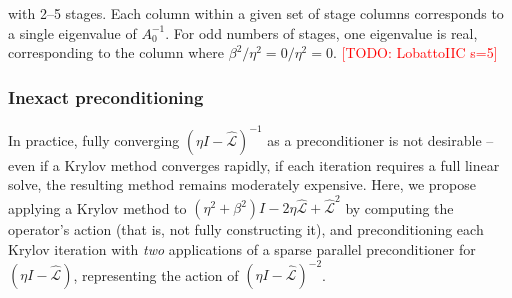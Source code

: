 \documentclass[review]{siamart}
\makeatletter
\newcommand{\todo}[1]{\textcolor{red}{[TODO\@: #1]}}
\makeatother
\begin{document}
{\begin{table}[!ht]
{  with 2--5 stages. Each column within a given set of stage columns corresponds to a
  single eigenvalue of $A_0^{-1}$. For odd numbers of stages, one eigenvalue is real,
  corresponding to the column where $\beta^2/\eta^2 = 0/\eta^2 = 0$.
  \todo{LobattoIIC s=5}}\label{tab:beta}
\end{table}
}

\subsubsection{Inexact preconditioning}

In practice, fully converging $(\eta I - \widehat{\mathcal{L}})^{-1}$ as a preconditioner
is not desirable --  even if a Krylov method converges rapidly, if each iteration requires
a full linear solve, the resulting method remains moderately expensive. Here, we propose
applying a Krylov method to $(\eta^2+\beta^2)I - 2\eta\widehat{\mathcal{L}} +
\widehat{\mathcal{L}}^2$ by computing the operator's action (that is, not fully constructing
it), and preconditioning each Krylov iteration with \textit{two} applications of a sparse
parallel preconditioner for $(\eta I - \widehat{\mathcal{L}})$, representing the action
of $(\eta I - \widehat{\mathcal{L}})^{-2}$.
\end{document}
